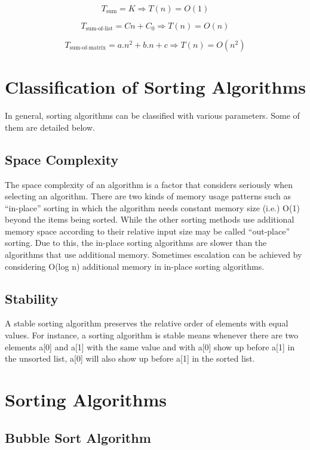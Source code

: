 \documentclass{article}
\begin{document}
\[
T_{\text{{sum}}} = K \Rightarrow T(n) = O(1)
\]

\[
T_{\text{{sum-of-list}}} = Cn + C_0 \Rightarrow T(n) = O(n)
\]

\[
T_{\text{{sum-of-matrix}}} = a.n^2 + b.n + c \Rightarrow T(n) = O(n^2)
\]



\section{Classification of Sorting Algorithms}
In general, sorting algorithms can be classified with various parameters. Some of
them are detailed below.\cite{karunanithi2014survey}

\subsection{Space Complexity}

The space complexity of an algorithm is a factor that considers seriously when
selecting an algorithm. There are two kinds of memory usage patterns such as “in-place” sorting in which the algorithm needs constant memory size (i.e.) O(1) beyond
the items being sorted. While the other sorting methods use additional memory
space according to their relative input size may be called “out-place” sorting. Due
to this, the in-place sorting algorithms are slower than the algorithms that use
additional memory. Sometimes escalation can be achieved by considering O(log n)
additional memory in in-place sorting algorithms.\cite{karunanithi2014survey}

\subsection{Stability}

A stable sorting algorithm preserves the relative order of elements with equal values.
For instance, a sorting algorithm is stable means whenever there are two elements
a[0] and a[1] with the same value and with a[0] show up before a[1] in the unsorted
list, a[0] will also show up before a[1] in the sorted list.\cite{karunanithi2014survey}



\section{Sorting Algorithms}

\subsection{Bubble Sort Algorithm}
\end{document}
